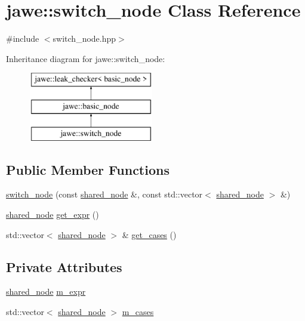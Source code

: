 \hypertarget{classjawe_1_1switch__node}{}\section{jawe\+:\+:switch\+\_\+node Class Reference}
\label{classjawe_1_1switch__node}


{\ttfamily \#include $<$switch\+\_\+node.\+hpp$>$}

Inheritance diagram for jawe\+:\+:switch\+\_\+node\+:\begin{figure}[H]
\begin{center}
\leavevmode
\includegraphics[height=3.000000cm]{classjawe_1_1switch__node}
\end{center}
\end{figure}
\subsection*{Public Member Functions}
\begin{DoxyCompactItemize}
\item 
\hyperlink{classjawe_1_1switch__node_a0698f6b33b788051e38d4abb6c044f48}{switch\+\_\+node} (const \hyperlink{namespacejawe_a3f307481d921b6cbb50cc8511fc2b544}{shared\+\_\+node} \&, const std\+::vector$<$ \hyperlink{namespacejawe_a3f307481d921b6cbb50cc8511fc2b544}{shared\+\_\+node} $>$ \&)
\item 
\hyperlink{namespacejawe_a3f307481d921b6cbb50cc8511fc2b544}{shared\+\_\+node} \hyperlink{classjawe_1_1switch__node_aa69da69f4352e215e711f094bd0d0e4a}{get\+\_\+expr} ()
\item 
std\+::vector$<$ \hyperlink{namespacejawe_a3f307481d921b6cbb50cc8511fc2b544}{shared\+\_\+node} $>$ \& \hyperlink{classjawe_1_1switch__node_aeef348f7129e56df25575241e66c98d7}{get\+\_\+cases} ()
\end{DoxyCompactItemize}
\subsection*{Private Attributes}
\begin{DoxyCompactItemize}
\item 
\hyperlink{namespacejawe_a3f307481d921b6cbb50cc8511fc2b544}{shared\+\_\+node} \hyperlink{classjawe_1_1switch__node_a716ea4d71332e08f8ca70151106b6340}{m\+\_\+expr}
\item 
std\+::vector$<$ \hyperlink{namespacejawe_a3f307481d921b6cbb50cc8511fc2b544}{shared\+\_\+node} $>$ \hyperlink{classjawe_1_1switch__node_a36b6289496f08b71428eb4ce1dca1226}{m\+\_\+cases}
\end{DoxyCompactItemize}
